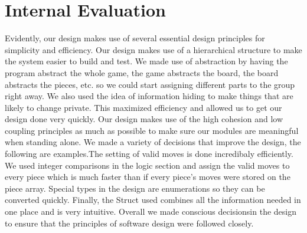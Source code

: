 \documentclass[10pt]{article}
\begin{document}
\section{Internal Evaluation}
Evidently, our design makes use of several essential design principles for simplicity and efficiency.
Our design makes use of a hierarchical structure to make the system easier to build and test. We
made use of abstraction by having the program abstract the whole game, the game abstracts the
board, the board abstracts the pieces, etc. so we could start assigning different parts to the group
right away. We also used the idea of information hiding to make things that are
likely to change private. This maximized efficiency and allowed us to get our design done very
quickly. Our design makes use of the high cohesion and low coupling principles as much as possible
to make sure our modules are meaningful when standing alone. We made a variety of decisions that improve the design, 
the following are examples.The setting of valid moves is done incredibaly efficiently. We used integer comparisons 
in the logic section and assign the valid moves to every piece which is much faster than if every piece's moves were 
stored on the piece array. Special types in the design are enumerations so they can be converted quickly. Finally, 
the Struct used combines all the information needed in one place and is very intuitive. Overall we made conscious 
decisionsin the design to ensure that the principles of software design were followed closely.

        
\end{document}
